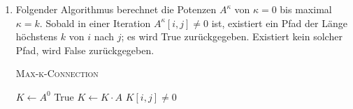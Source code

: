 \documentclass[a4paper]{scrartcl}
\begin{document}
\begin{enumerate}
    \item
        Folgender Algorithmus berechnet die Potenzen $A^\kappa$ von $\kappa=0$
        bis maximal $\kappa=k$.
        Sobald in einer Iteration $A^\kappa[i,j] \neq 0$ ist, existiert ein
        Pfad der Länge höchstens $k$ von $i$ nach $j$; es wird True
        zurückgegeben.
        Existiert kein solcher Pfad, wird False zurückgegeben.
        \begin{algorithm}
            \caption{\textsc{Max-k-Connection}}
            \begin{algorithmic}[1]
                    \State $K \gets A^0$
                            \State \Return True
                        \EndIf
                        \State $K \gets K \cdot A$
                    \EndFor
                    \State \Return $K[i,j] \neq 0$
                \EndProcedure
            \end{algorithmic}
        \end{algorithm}

\end{enumerate}
\end{document}
